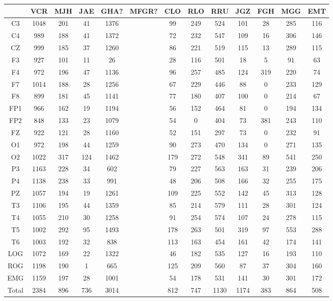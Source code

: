 \begin{SidewaysFigure}
\centering
\begin{tabular}{c|ccccc|cccc|ccc}
& VCR & MJH & JAE & GHA? & MFGR? 
& CLO & RLO & RRU & JGZ
& FGH & MGG & EMT \\
\hline
C3 &1048&201&41&1376&&99&249&524&101&28&285&116 \\
C4 &989&188&41&1372&&72&232&547&109&16&306&146 \\
CZ &999&185&37&1260&&86&221&519&115&13&289&115 \\
F3 &927&101&11&26&&28&116&501&18&5&91&63 \\
F4 &972&196&47&1136&&96&257&485&124&319&220&74 \\
F7 &1014&188&28&1256&&67&229&446&88&0&233&129 \\
F8 &899&181&45&1141&&77&180&407&100&0&214&67 \\
FP1 &966&162&19&1194&&56&152&464&81&0&194&134 \\
FP2 &848&133&23&1079&&54&0&404&73&381&243&110 \\
FZ &922&121&28&1160&&52&151&297&73&0&232&91 \\
O1 &972&198&44&1259&&90&273&470&134&0&271&135 \\
O2 &1022&317&124&1462&&179&272&548&341&89&541&250 \\
P3 &1163&228&34&602&&79&227&563&163&31&239&206 \\
P4 &1138&238&33&991&&48&206&508&166&32&255&175 \\
PZ &1057&194&19&1261&&109&225&552&142&45&313&128 \\
T3 &1106&195&44&1359&&85&214&579&111&28&301&124 \\
T4 &1055&210&30&1258&&91&254&574&107&24&278&115 \\
T5 &1002&292&95&1493&&178&263&501&319&97&553&288 \\
T6 &1003&192&32&838&&113&163&454&161&42&174&141 \\
LOG &1072&169&22&1322&&46&182&535&127&16&193&110 \\
ROG &1198&190&1&665&&125&209&560&87&37&304&160 \\
EMG &1159&197&28&1001&&54&178&531&141&30&301&172 \\
\hline
Total&2384&896&736&3014&&812&747&1130&1174&383&864&508
\end{tabular}
\caption{Total  de \'epocas PE dentro del registro pero que no fueron clasificadas
como MOR (fases W y N) para cada
canal. %
}
\label{total_gpos_nmor}
\end{SidewaysFigure}

